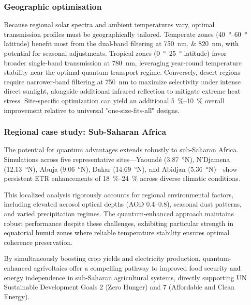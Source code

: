 \subsubsection{Geographic optimisation}

Because regional solar spectra and ambient temperatures vary, optimal transmission profiles must be geographically tailored. Temperate zones (\SIrange{40}{60}{\degree} latitude) benefit most from the dual-band filtering at \SIlist{750;820}{\nano\meter}, with potential for seasonal adjustments. Tropical zones (\SIrange{0}{25}{\degree} latitude) favor broader single-band transmission at \SI{780}{\nano\meter}, leveraging year-round temperature stability near the optimal quantum transport regime. Conversely, desert regions require narrower-band filtering at \SI{750}{\nano\meter} to maximize selectivity under intense direct sunlight, alongside additional infrared reflection to mitigate extreme heat stress. Site-specific optimization can yield an additional \SIrange{5}{10}{\percent} overall improvement relative to universal "one-size-fits-all" designs.

\subsubsection{Regional case study: Sub-Saharan Africa}

The potential for quantum advantages extends robustly to sub-Saharan Africa. Simulations across five representative sites---Yaound\'e (\SI{3.87}{\degree}N), N'Djamena (\SI{12.13}{\degree}N), Abuja (\SI{9.06}{\degree}N), Dakar (\SI{14.69}{\degree}N), and Abidjan (\SI{5.36}{\degree}N)---show persistent ETR enhancements of \SIrange{18}{24}{\percent} across diverse climatic conditions.

This localized analysis rigorously accounts for regional environmental factors, including elevated aerosol optical depths (AOD \numrange{0.4}{0.8}), seasonal dust patterns, and varied precipitation regimes. The quantum-enhanced approach maintains robust performance despite these challenges, exhibiting particular strength in equatorial humid zones where reliable temperature stability ensures optimal coherence preservation.

By simultaneously boosting crop yields and electricity production, quantum-enhanced agrivoltaics offer a compelling pathway to improved food security and energy independence in sub-Saharan agricultural systems, directly supporting UN Sustainable Development Goals 2 (Zero Hunger) and 7 (Affordable and Clean Energy).

